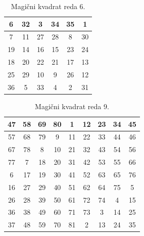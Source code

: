 \documentclass[a4paper,12pt]{article}
\theoremstyle{definition}
\newenvironment{magic}[3]{
    \begin{table}[h]
        \centering
        \caption{#1}
        \label{#3}
        \large
        \begin{tabular}{|*{#2}{c|}}
            \hline
            }
            {
        \end{tabular}
        \normalsize
    \end{table}
}
\begin{document}
\begin{magic}{Magični kvadrat reda 6.}{6}{table:mag6}
        6 & 32 &  3 & 34 & 35 &  1 \\\hline
        7 & 11 & 27 & 28 &  8 & 30 \\\hline
        19 & 14 & 16 & 15 & 23 & 24 \\\hline
        18 & 20 & 22 & 21 & 17 & 13 \\\hline
        25 & 29 & 10 &  9 & 26 & 12 \\\hline
        36 &  5 & 33 &  4 &  2 & 31 \\\hline
\end{magic}

\begin{magic}{Magični kvadrat reda 9.}{9}{table:mag9}
        47 & 58 & 69 & 80 &  1 & 12 & 23 & 34 & 45 \\\hline
        57 & 68 & 79 &  9 & 11 & 22 & 33 & 44 & 46 \\\hline
        67 & 78 &  8 & 10 & 21 & 32 & 43 & 54 & 56 \\\hline
        77 &  7 & 18 & 20 & 31 & 42 & 53 & 55 & 66 \\\hline
        6 & 17 & 19 & 30 & 41 & 52 & 63 & 65 & 76 \\\hline
        16 & 27 & 29 & 40 & 51 & 62 & 64 & 75 &  5 \\\hline
        26 & 28 & 39 & 50 & 61 & 72 & 74 &  4 & 15 \\\hline
        36 & 38 & 49 & 60 & 71 & 73 &  3 & 14 & 25 \\\hline
        37 & 48 & 59 & 70 & 81 &  2 & 13 & 24 & 35 \\\hline
\end{magic}

\newpage



\end{document}
